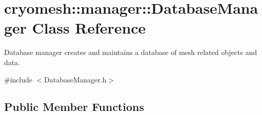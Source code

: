 \hypertarget{classcryomesh_1_1manager_1_1DatabaseManager}{\section{cryomesh\-:\-:manager\-:\-:\-Database\-Manager \-Class \-Reference}
\label{classcryomesh_1_1manager_1_1DatabaseManager}
}


\-Database manager creates and maintains a database of mesh related objects and data.  




{\ttfamily \#include $<$\-Database\-Manager.\-h$>$}

\subsection*{\-Public \-Member \-Functions}
